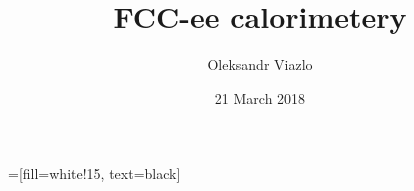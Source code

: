 \documentclass[8pt]{beamer}
\newif\ifplacelogo %
\begin{document}
\newcommand{\backupbegin}{
   \newcounter{finalframe}
   \setcounter{finalframe}{\value{framenumber}}
}
\newcommand{\backupend}{
   \setcounter{framenumber}{\value{finalframe}}
}

\newcommand{\myNode}{\tikz[baseline,inner sep=1pt] \node[anchor=base]}

 =[fill=white!15, text=black]



\title[ Pandora PFA FCC-ee \hspace{19.5em}\insertframenumber/
\inserttotalframenumber]{FCC-ee calorimetery }


	\author[Oleksandr Viazlo]{Oleksandr Viazlo\\ 
	}
	
       
	\date{21 March 2018}


	
   	\frame{\titlepage}

   	

\placelogofalse
\end{document}

